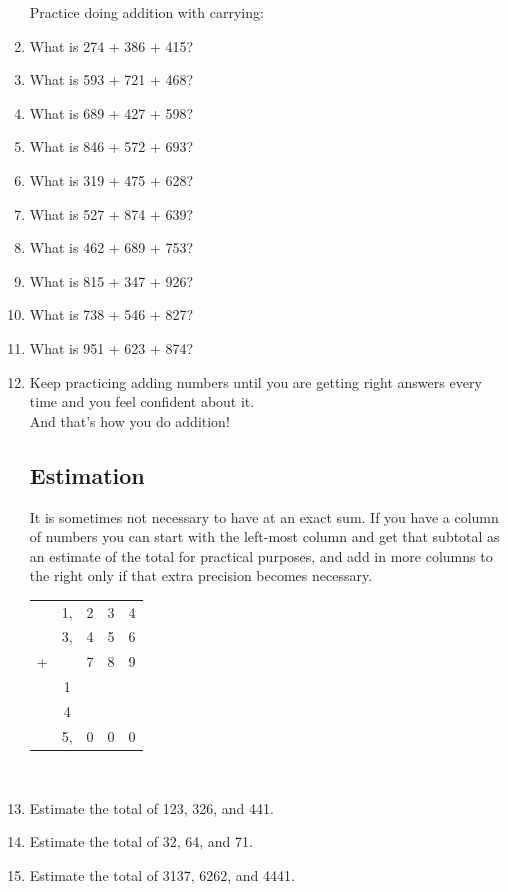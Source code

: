 \documentclass[12pt]{article}
\begin{document}
\begin{enumerate}
Practice doing addition with carrying:
\item What is 274 + 386 + 415?
\item What is 593 + 721 + 468?
\item What is 689 + 427 + 598?
\item What is 846 + 572 + 693?
\item What is 319 + 475 + 628?
\item What is 527 + 874 + 639?
\item What is 462 + 689 + 753?
\item What is 815 + 347 + 926?
\item What is 738 + 546 + 827?
\item What is 951 + 623 + 874?
    
\item Keep practicing adding numbers until you are getting right answers every time and you feel confident about it.\\

And that's how you do addition!\\

\subsection*{Estimation}
It is sometimes not necessary to have at an exact sum. If you have a column of numbers you can start with the left-most column and get that subtotal as an estimate of the total for practical purposes, and add in more columns to the right only if that extra precision becomes necessary.

\begin{center}
\begin{tabular}{c@{\,}c@{\,}c@{\,}c@{\,}c}
	&1,&2&3&4\\
	&3,&4&5&6\\
	+ & &7&8&9\\
	\hline
	& 1& &&\\
	& 4& & &\\
	\hline
	&5,&0&0&0\\
	\hline
	\hline
\end{tabular}\\
\end{center}

\item Estimate the total of 123, 326, and 441.
\item Estimate the total of 32, 64, and 71.
\item Estimate the total of 3137, 6262, and 4441.


\end{enumerate}
\end{document}

